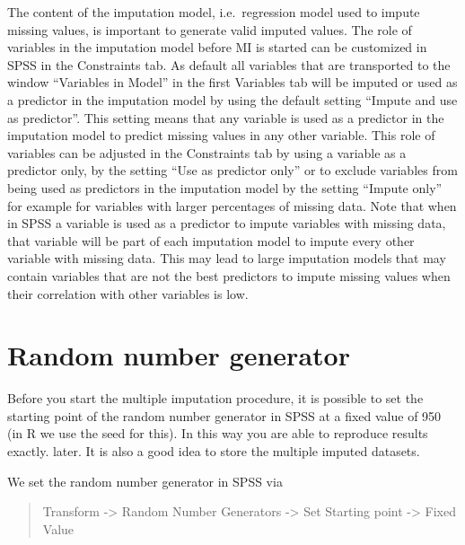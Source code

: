 \documentclass[
]{book}
\begin{document}
The content of the imputation model, i.e.~regression model used to
impute missing values, is important to generate valid imputed values.
The role of variables in the imputation model before MI is started can
be customized in SPSS in the Constraints tab. As default all variables
that are transported to the window ``Variables in Model'' in the first
Variables tab will be imputed or used as a predictor in the imputation
model by using the default setting ``Impute and use as predictor''. This
setting means that any variable is used as a predictor in the imputation
model to predict missing values in any other variable. This role of
variables can be adjusted in the Constraints tab by using a variable as
a predictor only, by the setting ``Use as predictor only'' or to exclude
variables from being used as predictors in the imputation model by the
setting ``Impute only'' for example for variables with larger
percentages of missing data. Note that when in SPSS a variable is used
as a predictor to impute variables with missing data, that variable will
be part of each imputation model to impute every other variable with
missing data. This may lead to large imputation models that may contain
variables that are not the best predictors to impute missing values when
their correlation with other variables is low.

\hypertarget{random-number-generator}{%
\section{Random number generator}\label{random-number-generator}}

Before you start the multiple imputation procedure, it is possible to
set the starting point of the random number generator in SPSS at a fixed
value of 950 (in R we use the seed for this). In this way you are able
to reproduce results exactly. later. It is also a good idea to store the
multiple imputed datasets.

We set the random number generator in SPSS via

\begin{quote}
Transform -\textgreater{} Random Number Generators -\textgreater{} Set
Starting point -\textgreater{} Fixed Value
\end{quote}
\end{document}

